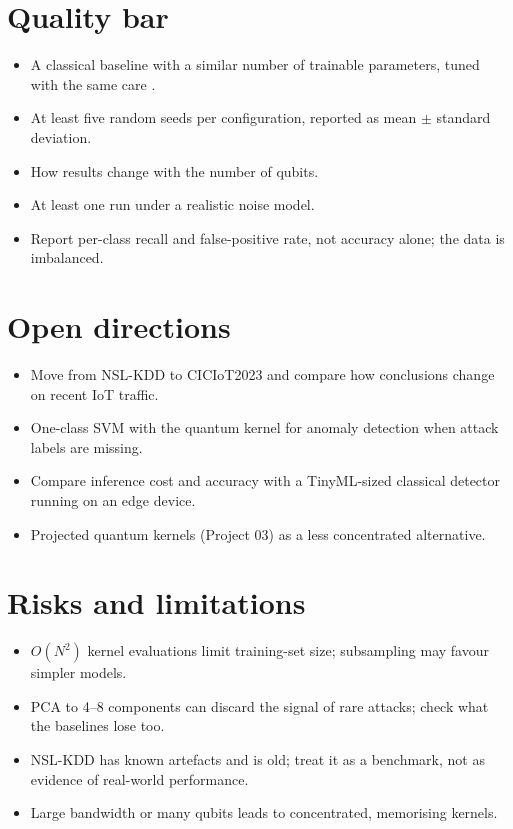 \documentclass[11pt,a4paper]{article}
\begin{document}
\section{Quality bar}
\begin{itemize}
  \item A classical baseline with a similar number of trainable parameters, tuned with the same care \citep{bowles2024}.
  \item At least five random seeds per configuration, reported as mean $\pm$ standard deviation.
  \item How results change with the number of qubits.
  \item At least one run under a realistic noise model.
  \item Report per-class recall and false-positive rate, not accuracy alone; the data is imbalanced.
\end{itemize}

\section{Open directions}
\begin{itemize}
  \item Move from NSL-KDD to CICIoT2023 and compare how conclusions change on recent IoT traffic.
  \item One-class SVM with the quantum kernel for anomaly detection when attack labels are missing.
  \item Compare inference cost and accuracy with a TinyML-sized classical detector running on an edge device.
  \item Projected quantum kernels (Project 03) as a less concentrated alternative.
\end{itemize}

\section{Risks and limitations}
\begin{itemize}
  \item $O(N^2)$ kernel evaluations limit training-set size; subsampling may favour simpler models.
  \item PCA to 4--8 components can discard the signal of rare attacks; check what the baselines lose too.
  \item NSL-KDD has known artefacts and is old; treat it as a benchmark, not as evidence of real-world performance.
  \item Large bandwidth or many qubits leads to concentrated, memorising kernels.
\end{itemize}
\end{document}
